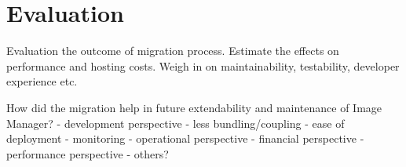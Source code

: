 \chapter{Evaluation} \label{cha:evaluation}

Evaluation the outcome of migration process. Estimate the effects on performance and hosting costs. Weigh in on maintainability, testability, developer experience etc.

How did the migration help in future extendability and maintenance of Image Manager?
- development perspective
  - less bundling/coupling
  - ease of deployment
  - monitoring
- operational perspective
- financial perspective
- performance perspective
- others?
